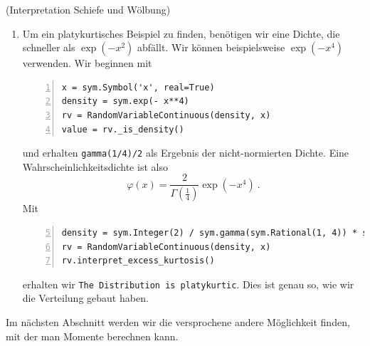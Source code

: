 \begin{Beispiel}{(Interpretation Schiefe und Wölbung)}
\begin{enumerate}[label=(\roman*)]
\item \hypertarget{Bsp:Platy}{} Um ein platykurtisches Beispiel zu finden, benötigen wir eine Dichte, die schneller als $\exp(- x^2)$ abfällt. Wir können beispielsweise $\exp(- x^4)$ verwenden. Wir beginnen mit
\begin{lstlisting}[numbers=left, numberstyle=\tiny\color{codegray}]
x = sym.Symbol('x', real=True)
density = sym.exp(- x**4)
rv = RandomVariableContinuous(density, x)
value = rv._is_density()
\end{lstlisting}
und erhalten \lstinline|gamma(1/4)/2| als Ergebnis der nicht-normierten Dichte. Eine Wahrscheinlichkeitsdichte ist also
\[\varphi(x) = \frac{2}{\Gamma\left( \frac{1}{4} \right)} \exp(- x^4)~.\]
Mit
\begin{lstlisting}[numbers=left, numberstyle=\tiny\color{codegray}, firstnumber=5]
density = sym.Integer(2) / sym.gamma(sym.Rational(1, 4)) * sym.exp(- x**4)
rv = RandomVariableContinuous(density, x)
rv.interpret_excess_kurtosis()
\end{lstlisting} erhalten wir \lstinline|The Distribution is platykurtic|. Dies ist genau so, wie wir die Verteilung \glqq gebaut\grqq{} haben.
\end{enumerate}
\end{Beispiel}

\vspace*{-\medskipamount}

Im nächsten Abschnitt werden wir die versprochene andere Möglichkeit finden, mit der man Momente berechnen kann.